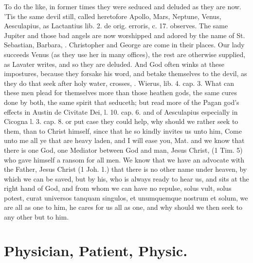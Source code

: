 {To do the like, in former times they were seduced and deluded as they
are now. 'Tis the same devil still, called heretofore Apollo, Mars,
Neptune, Venus, Aesculapius, \etc{} as Lactantius lib. 2. de orig.
erroris, c. 17. observes. The same Jupiter and those bad angels are now
worshipped and adored by the name of St. Sebastian, Barbara, \etc{}.
Christopher and George are come in their places. Our lady succeeds
Venus (as they use her in many offices), the rest are otherwise
supplied, as Lavater writes, and so they are deluded. And
God often winks at these impostures, because they forsake his word, and
betake themselves to the devil, as they do that seek after holy water,
crosses, \etc{}. Wierus, lib. 4. cap. 3. What can these men plead for
themselves more than those heathen gods, the same cures done by both,
the same spirit that seduceth; but read more of the Pagan god's effects
in Austin de Civitate Dei, l. 10. cap. 6. and of Aesculapius especially
in Cicogna l. 3. cap. 8. or put case they could help, why should we
rather seek to them, than to Christ himself, since that he so kindly
invites us unto him, Come unto me all ye that are heavy laden, and I
will ease you, Mat.  and we know that there is one God, one Mediator
between God and man, Jesus Christ, (1 Tim.  5) who gave himself a
ransom for all men. We know that we have an  advocate with the
Father, Jesus Christ (1 Joh.  1.) that there is no other name under
heaven, by which we can be saved, but by his, who is always ready to
hear us, and sits at the right hand of God, and from  whom we can
have no repulse, solus vult, solus potest, curat universos tanquam
singulos, et unumquemque nostrum et solum, we are all as one to
him, he cares for us all as one, and why should we then seek to any
other but to him.


\section{Physician, Patient, Physic.}

}
